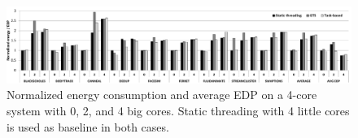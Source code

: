 \begin{figure}[t]%
	\centering
	\includegraphics[width=1.0\textwidth]{figures/energy_EDP-4.pdf}
	\vspace{-0.5cm}
	\caption{Normalized energy consumption and average EDP on a 4-core system with 0, 2, and 4 big cores. Static threading with 4 little cores is used as baseline in both cases. }
	\label{fig:energy4}%
	\vspace{-0.3cm}
\end{figure}



